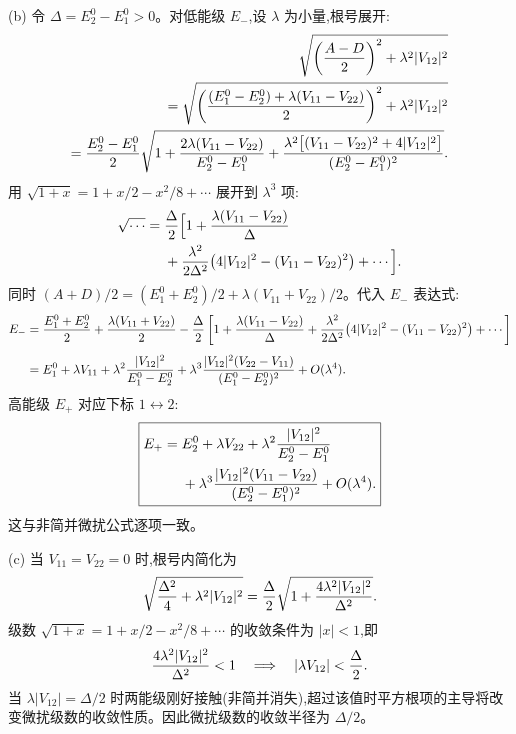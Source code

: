 \begin{question}
\begin{solution}
(b) 令 $\Delta=E_2^0-E_1^0>0$。对低能级 $E_-$,设 $\lambda$ 为小量,根号展开:
\[
\begin{aligned}\sqrt{\left({A-D\over2}\right)^2+\lambda^2|V_{12}|^2}\\=\sqrt{\left({(E_1^0-E_2^0)+\lambda(V_{11}-V_{22})\over2}\right)^2+\lambda^2|V_{12}|^2}\\={E_2^0-E_1^0\over2}\sqrt{1+{2\lambda(V_{11}-V_{22})\over E_2^0-E_1^0}+{\lambda^2\bigl[(V_{11}-V_{22})^2+4|V_{12}|^2\bigr]\over (E_2^0-E_1^0)^2}}.\end{aligned}
\]
用 $\sqrt{1+x}=1+x/2-x^2/8+\cdots$ 展开到 $\lambda^3$ 项:
\[
\begin{aligned}\sqrt{\cdots}={}&{\Delta\over2}\Bigl[1+{\lambda(V_{11}-V_{22})\over\Delta}\\&+{\lambda^2\over2\Delta^2}\bigl(4|V_{12}|^2-(V_{11}-V_{22})^2\bigr)+\cdots\Bigr].\end{aligned}
\]
同时 $(A+D)/2=(E_1^0+E_2^0)/2+\lambda(V_{11}+V_{22})/2$。代入 $E_-$ 表达式:
\[
\begin{aligned}
E_-&={E_1^0+E_2^0\over2}+{\lambda(V_{11}+V_{22})\over2}
-{\Delta\over2}\left[1+{\lambda(V_{11}-V_{22})\over\Delta}
+{\lambda^2\over2\Delta^2}\bigl(4|V_{12}|^2-(V_{11}-V_{22})^2\bigr)+\cdots\right] \\[4pt]
&=E_1^0+\lambda V_{11}
+\lambda^2{|V_{12}|^2\over E_1^0-E_2^0}
+\lambda^3{|V_{12}|^2(V_{22}-V_{11})\over (E_1^0-E_2^0)^2}+O(\lambda^4).
\end{aligned}
\]
高能级 $E_+$ 对应下标 $1\leftrightarrow2$:
\[
\boxed{\begin{aligned}E_+={}&E_2^0+\lambda V_{22}+\lambda^2{|V_{12}|^2\over E_2^0-E_1^0}\\&+\lambda^3{|V_{12}|^2(V_{11}-V_{22})\over (E_2^0-E_1^0)^2}+O(\lambda^4).\end{aligned}}
\]
这与非简并微扰公式逐项一致。

(c) 当 $V_{11}=V_{22}=0$ 时,根号内简化为
\[
\sqrt{{\Delta^2\over4}+\lambda^2|V_{12}|^2}
={\Delta\over2}\sqrt{1+{4\lambda^2|V_{12}|^2\over\Delta^2}}.
\]
级数 $\sqrt{1+x}=1+x/2-x^2/8+\cdots$ 的收敛条件为 $|x|<1$,即
\[
{4\lambda^2|V_{12}|^2\over\Delta^2}<1\quad\Longrightarrow\quad
|\lambda V_{12}|<{\Delta\over2}.
\]
当 $\lambda|V_{12}|=\Delta/2$ 时两能级刚好接触(非简并消失),超过该值时平方根项的主导将改变微扰级数的收敛性质。因此微扰级数的收敛半径为 $\Delta/2$。
\end{solution}
\end{question}

